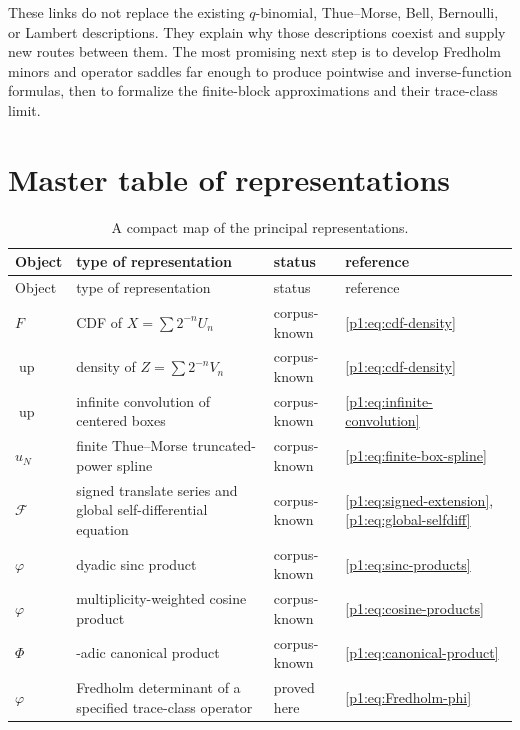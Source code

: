 \documentclass[11pt,oneside]{article}
\theoremstyle{definition}
\newcommand{\Up}{\operatorname{up}}
\newcommand{\PhiF}{\Phi}
\newcommand{\phiF}{\varphi}
\begin{document}
These links do not replace the existing \(q\)-binomial, Thue--Morse, Bell, Bernoulli,
or Lambert descriptions.  They explain why those descriptions coexist and supply new
routes between them.  The most promising next step is to develop Fredholm minors and
operator saddles far enough to produce pointwise and inverse-function formulas, then
to formalize the finite-block approximations and their trace-class limit.

\appendix

\section{Master table of representations}
\label{p1:app:atlas}

\small
\begin{longtable}{>{\raggedright\arraybackslash}p{}
                  >{\raggedright\arraybackslash}p{}
                  >{\raggedright\arraybackslash}p{}
                  >{\raggedright\arraybackslash}p{}}
\caption{A compact map of the principal representations.}\label{p1:tab:master-atlas}\\
\toprule
Object&type of representation&status&reference\\
\midrule
\endfirsthead
\toprule
Object&type of representation&status&reference\\
\midrule
\endhead
\bottomrule
\endfoot
\(F\)&CDF of \(X=\sum2^{-n}U_n\)&corpus-known&\eqref{p1:eq:cdf-density}\\
\(\Up\)&density of \(Z=\sum2^{-n}V_n\)&corpus-known&\eqref{p1:eq:cdf-density}\\
\(\Up\)&infinite convolution of centered boxes&corpus-known&\eqref{p1:eq:infinite-convolution}\\
\(u_N\)&finite Thue--Morse truncated-power spline&corpus-known&\eqref{p1:eq:finite-box-spline}\\
\(\mathcal F\)&signed translate series and global self-differential equation&corpus-known&\eqref{p1:eq:signed-extension}, \eqref{p1:eq:global-selfdiff}\\
\(\phiF\)&dyadic sinc product&corpus-known&\eqref{p1:eq:sinc-products}\\
\(\phiF\)&multiplicity-weighted cosine product&corpus-known&\eqref{p1:eq:cosine-products}\\
\(\PhiF\)&2-adic canonical product&corpus-known&\eqref{p1:eq:canonical-product}\\
\(\phiF\)&Fredholm determinant of a specified trace-class operator&proved here&\eqref{p1:eq:Fredholm-phi}\\

\end{longtable}
\end{document}
